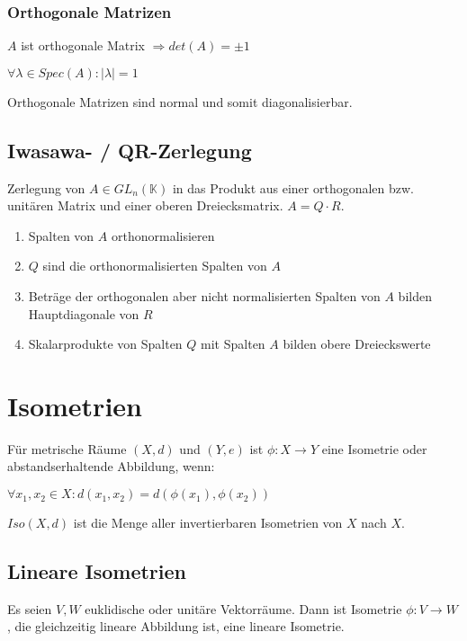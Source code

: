 \subsubsection*{Orthogonale Matrizen}

$A$ ist orthogonale Matrix $\Rightarrow det(A)=\pm 1$

$\forall \lambda \in Spec(A) : |\lambda| = 1$

Orthogonale Matrizen sind normal und somit diagonalisierbar.

\subsection*{Iwasawa- / QR-Zerlegung}

Zerlegung von $A \in GL_n(\mathbb{K})$ in das Produkt aus einer orthogonalen bzw. unitären Matrix und einer oberen Dreiecksmatrix. $A = Q \cdot R$.

\begin{enumerate}[leftmargin=4mm]
	\item Spalten von $A$ orthonormalisieren
	\item $Q$ sind die orthonormalisierten Spalten von $A$
	\item Beträge der orthogonalen aber nicht normalisierten Spalten von $A$ bilden Hauptdiagonale von $R$
	\item Skalarprodukte von Spalten $Q$ mit Spalten $A$ bilden obere Dreieckswerte
\end{enumerate}

\section*{Isometrien}

Für metrische Räume $(X, d)$ und $(Y, e)$ ist $\phi : X \rightarrow Y$ eine Isometrie oder abstandserhaltende Abbildung, wenn:

$\forall x_1, x_2 \in X : d(x_1, x_2) = d(\phi(x_1), \phi(x_2))$

$Iso(X, d)$ ist die Menge aller invertierbaren Isometrien von $X$ nach $X$.

\subsection*{Lineare Isometrien}

Es seien $V, W$ euklidische oder unitäre Vektorräume. Dann ist Isometrie $\phi : V \rightarrow W$, die gleichzeitig lineare Abbildung ist, eine lineare Isometrie.

